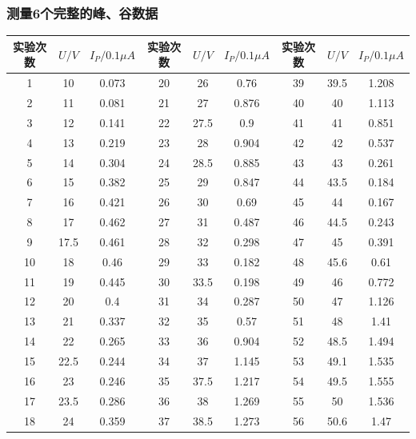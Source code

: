 \documentclass[a4paper,UTF8]{ctexart}
\begin{document}
\subsubsection{测量6个完整的峰、谷数据}

\newpage

\begin{table}[H]
    \centering
    \begin{tabular}{|c|c|c|c|c|c|c|c|c|}
    \hline
        实验次数 & $U/V$ & $I_{P}/0.1 \mu A$ & 实验次数 & $U/V$ & $I_{P}/0.1 \mu A$ & 实验次数 & $U/V$ & $I_{P}/0.1 \mu A$ \\ \hline
        1 & 10 & 0.073 & 20 & 26 & 0.76 & 39 & 39.5 & 1.208 \\ \hline
        2 & 11 & 0.081 & 21 & 27 & 0.876 & 40 & 40 & 1.113 \\ \hline
        3 & 12 & 0.141 & 22 & 27.5 & 0.9 & 41 & 41 & 0.851 \\ \hline
        4 & 13 & 0.219 & 23 & 28 & 0.904 & 42 & 42 & 0.537 \\ \hline
        5 & 14 & 0.304 & 24 & 28.5 & 0.885 & 43 & 43 & 0.261 \\ \hline
        6 & 15 & 0.382 & 25 & 29 & 0.847 & 44 & 43.5 & 0.184 \\ \hline
        7 & 16 & 0.421 & 26 & 30 & 0.69 & 45 & 44 & 0.167 \\ \hline
        8 & 17 & 0.462 & 27 & 31 & 0.487 & 46 & 44.5 & 0.243 \\ \hline
        9 & 17.5 & 0.461 & 28 & 32 & 0.298 & 47 & 45 & 0.391 \\ \hline
        10 & 18 & 0.46 & 29 & 33 & 0.182 & 48 & 45.6 & 0.61 \\ \hline
        11 & 19 & 0.445 & 30 & 33.5 & 0.198 & 49 & 46 & 0.772 \\ \hline
        12 & 20 & 0.4 & 31 & 34 & 0.287 & 50 & 47 & 1.126 \\ \hline
        13 & 21 & 0.337 & 32 & 35 & 0.57 & 51 & 48 & 1.41 \\ \hline
        14 & 22 & 0.265 & 33 & 36 & 0.904 & 52 & 48.5 & 1.494 \\ \hline
        15 & 22.5 & 0.244 & 34 & 37 & 1.145 & 53 & 49.1 & 1.535 \\ \hline
        16 & 23 & 0.246 & 35 & 37.5 & 1.217 & 54 & 49.5 & 1.555 \\ \hline
        17 & 23.5 & 0.286 & 36 & 38 & 1.269 & 55 & 50 & 1.536 \\ \hline
        18 & 24 & 0.359 & 37 & 38.5 & 1.273 & 56 & 50.6 & 1.47 \\ \hline

\end{tabular}
\end{table}
\end{document}
